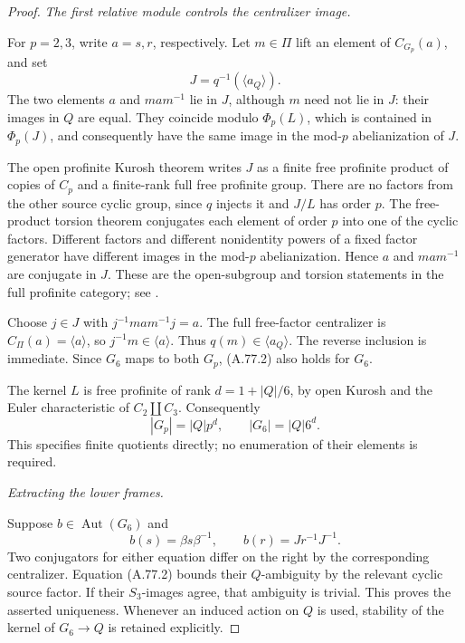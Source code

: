 \begin{proof}
\emph{The first relative module controls the centralizer image.}\par
For \(p=2,3\), write \(a=s,r\), respectively. Let \(m\in\Pi\)
lift an element of \(C_{G_p}(a)\), and set
\[
                       J=q^{-1}(\langle a_Q\rangle).
\]
The two elements \(a\) and \(mam^{-1}\) lie in \(J\), although
\(m\) need not lie in \(J\): their images in \(Q\) are equal.
They coincide modulo \(\Phi_p(L)\), which is contained in
\(\Phi_p(J)\), and consequently have the same image in the
mod-\(p\) abelianization of \(J\).

The open profinite Kurosh theorem writes \(J\) as a finite free
profinite product of copies of \(C_p\) and a finite-rank full
free profinite group. There are no factors from the other source
cyclic group, since \(q\) injects it and \(J/L\) has order \(p\).
The free-product torsion theorem conjugates each element of order
\(p\) into one of the cyclic factors. Different factors and
different nonidentity powers of a fixed factor generator have
different images in the mod-\(p\) abelianization. Hence
\(a\) and \(mam^{-1}\) are conjugate in \(J\). These are the
open-subgroup and torsion statements in the full profinite
category; see \citet{A_HR1985}.

Choose \(j\in J\) with \(j^{-1}mam^{-1}j=a\). The full
free-factor centralizer is \(C_\Pi(a)=\langle a\rangle\), so
\(j^{-1}m\in\langle a\rangle\). Thus
\(q(m)\in\langle a_Q\rangle\). The reverse inclusion is
immediate. Since \(G_6\) maps to both \(G_p\), (A.77.2) also
holds for \(G_6\).

The kernel \(L\) is free profinite of rank \(d=1+|Q|/6\), by
open Kurosh and the Euler characteristic of \(C_2\amalg C_3\).
Consequently
\[
            |G_p|=|Q|p^d,\qquad |G_6|=|Q|6^d.
 \tag{A.77.5}
\]
This specifies finite quotients directly; no enumeration of their
elements is required.

\emph{Extracting the lower frames.}\par
Suppose \(b\in\operatorname{Aut}(G_6)\) and
\[
          b(s)=\beta s\beta^{-1},\qquad
          b(r)=Jr^{-1}J^{-1}.
 \tag{A.77.6}
\]
Two conjugators for either equation differ on the right by the
corresponding centralizer. Equation (A.77.2) bounds their
\(Q\)-ambiguity by the relevant cyclic source factor. If their
\(S_3\)-images agree, that ambiguity is trivial. This proves the
asserted uniqueness. Whenever an induced action on \(Q\) is used,
stability of the kernel of \(G_6\to Q\) is retained explicitly.


\end{proof}

